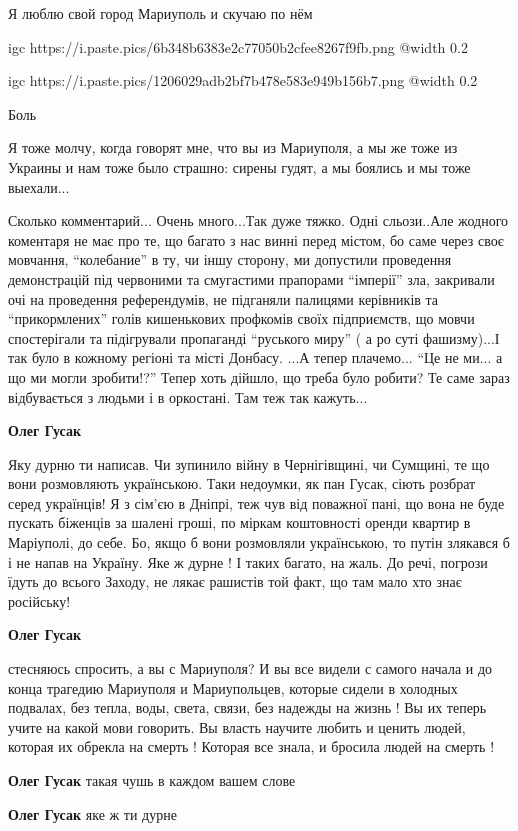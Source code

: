 
Я люблю свой город Мариуполь и скучаю по нём

\ifcmt
  igc https://i.paste.pics/6b348b6383e2c77050b2cfee8267f9fb.png
  @width 0.2
\fi


\ifcmt
  igc https://i.paste.pics/1206029adb2bf7b478e583e949b156b7.png
  @width 0.2
\fi


Боль


Я тоже молчу, когда говорят мне, что вы из Мариуполя, а мы же тоже из Украины и
нам тоже было страшно: сирены гудят, а мы боялись и мы тоже выехали...


Сколько комментарий... Очень много...Так дуже тяжко. Одні сльози..Але жодного
коментаря не має про те, що багато з нас винні перед містом, бо саме через своє
мовчання, \enquote{колебание} в ту, чи іншу сторону, ми допустили проведення
демонстрацій під червоними та смугастими прапорами \enquote{імперії} зла, закривали
очі на проведення референдумів, не підганяли палицями керівників та
\enquote{прикормлених} голів кишенькових профкомів своїх підприємств, що мовчи
спостерігали та підігрували пропаганді \enquote{руського миру} ( а ро суті
фашизму)...І так було в кожному регіоні та місті Донбасу. ...А тепер плачемо...
\enquote{Це не ми... а що ми могли зробити!?} Тепер хоть дійшло, що треба було робити?
Те саме зараз відбувається з людьми і в оркостані. Там теж так кажуть...

\begin{itemize} %
\textbf{Олег Гусак} 

Яку дурню ти написав. Чи зупинило війну в Чернігівщині, чи Сумщині, те що вони
розмовляють українською. Таки недоумки, як пан Гусак, сіють розбрат серед
українців! Я з сім'єю в Дніпрі, теж чув від поважної пані, що вона не буде
пускать біженців за шалені гроші, по міркам коштовності оренди квартир в
Маріуполі, до себе. Бо, якщо б вони розмовляли українською, то путін злякався
б і не напав на Україну. Яке ж дурне ! І таких багато, на жаль. До речі,
погрози їдуть до всього Заходу, не лякає рашистів той факт, що там мало хто
знає російську!

\textbf{Олег Гусак} 

стесняюсь спросить, а вы с Мариуполя? И вы все видели с самого начала и до
конца трагедию Мариуполя и Мариупольцев, которые сидели в холодных подвалах,
без тепла, воды, света, связи, без надежды на жизнь ! Вы их теперь учите на
какой мови говорить. Вы власть научите любить и ценить людей, которая их
обрекла на смерть ! Которая все знала, и бросила людей на смерть !

\textbf{Олег Гусак} такая чушь в каждом вашем слове

\textbf{Олег Гусак} яке ж ти дурне 🤯

\end{itemize} %

